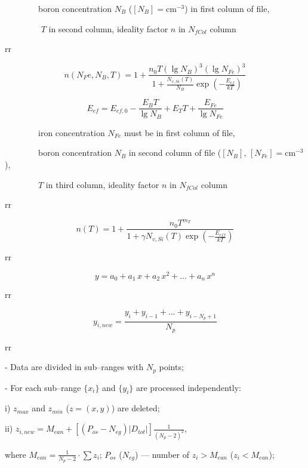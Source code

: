 \documentclass[14pt]{article}
\numberwithin{equation}{part}
\begin{document}
$\qquad\qquad$boron concentration $N_B$ ($[N_B]=$cm$^{-3}$) in first column of file,

$\qquad\qquad$ $T$ in second column,
ideality factor $n$ in $N_{fCol}$ column


rr

\begin{equation*}
    n(N_Fe, N_B, T)=1+\frac{n_0T(\lg N_B)^{3}(\lg N_{Fe})^{3}}{1+\frac{N_{v,Si}(T)}{N_B}\exp\left(-\frac{E_{ef}}{kT}\right)}
\end{equation*}

\begin{equation*}
    E_{ef}=E_{ef,0}-\frac{E_B T}{\lg N_B}+E_T T+\frac{E_{Fe}}{\lg N_{Fe}}
\end{equation*}

$\qquad\qquad$iron concentration $N_{Fe}$ must be in first column of file,

$\qquad\qquad$boron concentration $N_B$ in second column of file ($[N_B],\, [N_{Fe}]=$cm$^{-3}$),

$\qquad\qquad$$T$ in third column,
ideality factor $n$ in $N_{fCol}$ column


rr

\begin{equation*}
    n(T)=1+\frac{n_0T^{m_T}}{1+\gamma N_{v,Si}(T)\exp\left(-\frac{E_{eff}}{kT}\right)}
\end{equation*}



rr

\begin{equation*}
    y=a_0+a_1\,x+a_2\,x^2+\ldots+a_n\,x^n
\end{equation*}


rr

\begin{equation*}
    y_{i,new} =\frac{y_i+y_{i-1}+\ldots+y_{i-N_p+1}}{N_p}
\end{equation*}


rr

- Data are divided in sub--ranges with $N_p$ points;

- For each sub--range $\{x_i\}$ and $\{y_i\}$ are processed independently:

i) $z_{max}$ and $z_{min}$ ($z=(x, y)$) are deleted;

ii) $z_{i,new} =M_{ean}+[(P_{os}-N_{eg})|D_{tot}|]\frac{1}{(N_p-2)^2}$,

where $M_{ean}=\frac{1}{N_p-2}\cdot\sum z_i$;
$P_{os}$ ($N_{eg}$) --- number of $z_i>M_{ean}$ ($z_i<M_{ean}$);
\end{document}
